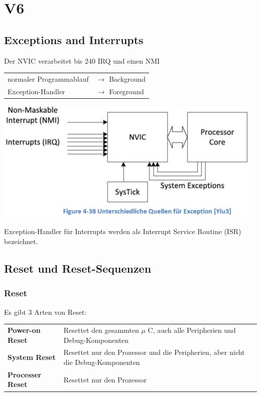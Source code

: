 \section{V6}
\begin{multicols}{2}
    \begin{minipage}{\linewidth}
        \subsection{Exceptions and Interrupts}\label{Exceptions}
        Der NVIC verarbeitet bis 240 IRQ und einen NMI\\
        \begin{tabular}{ll}
            normaler Programmablauf& $\rightarrow$ Background  \\ 
            Exception-Handler& $\rightarrow$ Foreground  \\ 
        \end{tabular} 
    \end{minipage}
    
    \includegraphics[width=\linewidth]{images/NVICExcp}
\end{multicols}
Exception-Handler für Interrupts werden als Interrupt Service Routine (ISR) bezeichnet.

\subsection{Reset und Reset-Sequenzen}
\subsubsection{Reset}
Es gibt 3 Arten von Reset:\\
\begin{tabular}{ll}
    \textbf{Power-on Reset}  & Resettet den gesammten $\mu$ C, auch alle Peripherien und Debug-Komponenten \\ 
    \textbf{System Reset}    & Resettet nur den Prozessor und die Peripherien, aber nicht die Debug-Komponenten \\ 
    \textbf{Processer Reset} & Resettet nur den Prozessor\\
\end{tabular}

